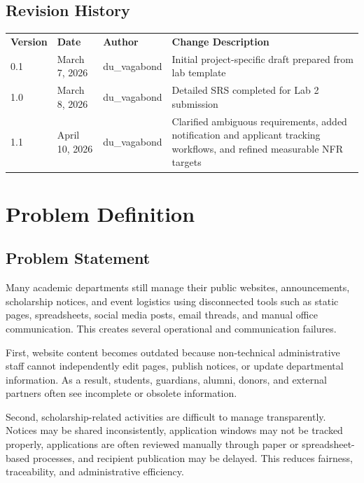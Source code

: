 \documentclass[12pt,a4paper]{article}
\newcommand{\thead}[1]{\textbf{\color{white}#1}}
\newcommand{\theadrow}{\rowcolor{headerblue}}
\begin{document}
\subsection{Revision History}

\begin{tabularx}{\textwidth}{@{}l l l Y@{}}
\theadrow \thead{Version} & \thead{Date} & \thead{Author} & \thead{Change Description} \\
0.1 & March 7, 2026 & du\_vagabond & Initial project-specific draft prepared from lab template \\
1.0 & March 8, 2026 & du\_vagabond & Detailed SRS completed for Lab 2 submission \\
1.1 & April 10, 2026 & du\_vagabond & Clarified ambiguous requirements, added notification and applicant tracking workflows, and refined measurable NFR targets \\
\end{tabularx}

\newpage
\section{Problem Definition}

\subsection{Problem Statement}

Many academic departments still manage their public websites, announcements, scholarship notices, and event logistics using disconnected tools such as static pages, spreadsheets, social media posts, email threads, and manual office communication. This creates several operational and communication failures.

First, website content becomes outdated because non-technical administrative staff cannot independently edit pages, publish notices, or update departmental information. As a result, students, guardians, alumni, donors, and external partners often see incomplete or obsolete information.

Second, scholarship-related activities are difficult to manage transparently. Notices may be shared inconsistently, application windows may not be tracked properly, applications are often reviewed manually through paper or spreadsheet-based processes, and recipient publication may be delayed. This reduces fairness, traceability, and administrative efficiency.
\end{document}
